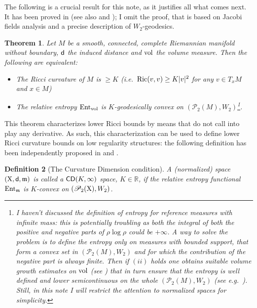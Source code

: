 \documentclass[11pt]{article}
\numberwithin{equation}{section}
\newtheorem{theorem}{Theorem}[section]
\newtheorem{definition}[theorem]{Definition}
\newcommand{\R}{\mathbb{R}}
\newcommand{\prd}{\mathscr P_2}
\newcommand{\X}{{\rm X}}
\newcommand{\sfd}{{\sf d}}
\newcommand{\mm}{{\mathfrak m}}
\newcommand{\vol}{{\rm vol}}								%
\newcommand{\CD}{{\sf CD}}
\newcommand{\ent}{{\rm Ent}_\mm}
\newcommand{\entm}[1]{{\rm Ent}_{#1}}
\newcommand{\Ric}{{\rm Ric}}
\begin{document}
The following is a crucial result for this note, as it justifies all what comes next. It has been proved in \cite{vRS05} (see also \cite{OV00} and \cite{CEMCS01}); I omit the proof, that is based on Jacobi fields analysis and a  precise description of $W_2$-geodesics.%
\begin{theorem}\label{thm:sturmvonrenesse} Let $M$ be a smooth, connected, complete Riemannian manifold without boundary, $\sfd$ the induced distance and $\vol$ the volume measure. Then the following are equivalent:
\begin{itemize}
\item[i)] The Ricci curvature of $M$ is  $\geq K$ (i.e.\ $\Ric(v,v)\geq K|v|^2$ for any $v\in T_xM$ and $x\in M$)
\item[ii)] The relative entropy $\entm\vol$ is $K$-geodesically convex on $(\prd(M),W_2)$\footnote{I haven't discussed the definition of entropy for reference measures with infinite mass: this is potentially troubling as both the integral of both the positive and negative parts of $\rho\log\rho$ could be $+\infty$. A way to solve the problem is to define the entropy only on measures with bounded support, that form a convex set in $(\prd(M),W_2)$ and for which the contribution of the negative part is always finite. Then if $(ii)$ holds one obtains suitable volume growth estimates on $\vol$ (see \cite[Theorem 4.26]{Sturm06I}) that in turn ensure that the entropy is well defined and lower semicontinuous on the whole $(\prd(M),W_2)$ (see e.g.\ \cite[Section 4.1.1]{GMS15}). Still, in this note I will restrict the attention to normalized spaces for simplicity.}.
\end{itemize}
\end{theorem}
This theorem characterizes lower Ricci bounds by means that do not call into play any derivative. As such, this characterization can be used to define lower Ricci curvature bounds on low regularity structures: the following definition has been independently proposed in \cite{Lott-Villani09} and \cite{Sturm06I}.
\begin{definition}[The Curvature Dimension condition]\label{def:cd}
A (normalized) space $(\X,\sfd,\mm)$ is called a $\CD(K,\infty)$ space, $K\in\R$, if the relative entropy functional $\ent$ is $K$-convex on $(\prd(\X),W_2)$. 
\end{definition}
\end{document}
